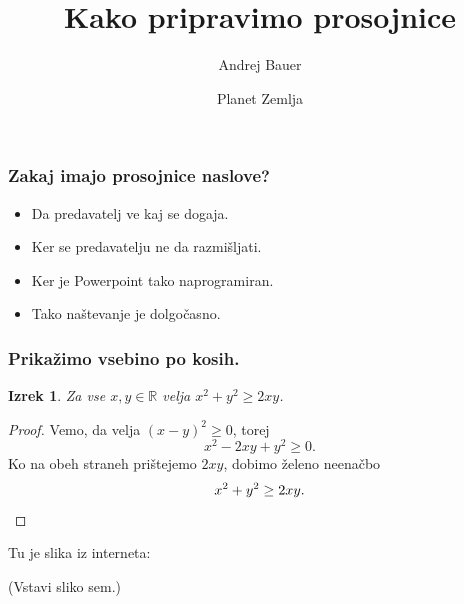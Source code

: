 \documentclass[14pt]{beamer}
\newtheorem{izrek}{Izrek}
\begin{document}
\title{Kako pripravimo prosojnice}
\author{Andrej Bauer}
\date{Planet Zemlja}

\begin{frame}
  \titlepage
\end{frame}

\begin{frame}
  \frametitle{Zakaj imajo prosojnice naslove?}

  \begin{itemize}
  \item Da predavatelj ve kaj se dogaja.
  \item Ker se predavatelju ne da razmišljati.
  \item Ker je Powerpoint tako naprogramiran.
  \item Tako naštevanje je dolgočasno.
  \end{itemize}


\end{frame}

\begin{frame}
  \frametitle{Prikažimo vsebino po kosih.}

  \begin{izrek}
    Za vse $x, y \in \mathbb{R}$ velja $x^2 + y^2 \geq 2 x y$.
  \end{izrek}

  \pause

  \begin{proof}
    Vemo, da velja $(x - y)^2 \geq 0$, torej
    \begin{equation*}
      x^2 - 2 x y + y^2 \geq 0.
    \end{equation*}
    \pause
    Ko na obeh straneh prištejemo $2 x y$, dobimo želeno neenačbo
    \begin{equation*}
      x^2 + y^2 \geq 2 x y. \qedhere
    \end{equation*}
  \end{proof}

\end{frame}

\begin{frame}
  Tu je slika iz interneta:
  \begin{center}
    (Vstavi sliko sem.)
  \end{center}


\end{frame}
\end{document}
